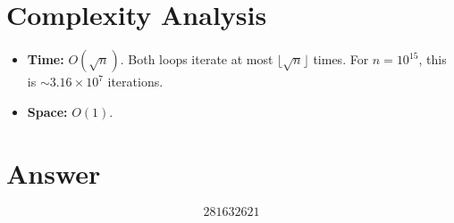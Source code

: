 \documentclass[11pt]{article}
\begin{document}
\section{Complexity Analysis}

\begin{itemize}
  \item \textbf{Time:} $O(\sqrt{n})$.  Both loops iterate at most $\lfloor\sqrt{n}\rfloor$ times.  For $n = 10^{15}$, this is ${\sim}3.16 \times 10^7$ iterations.
  \item \textbf{Space:} $O(1)$.
\end{itemize}

\section{Answer}

\[
\boxed{281632621}
\]
\end{document}
